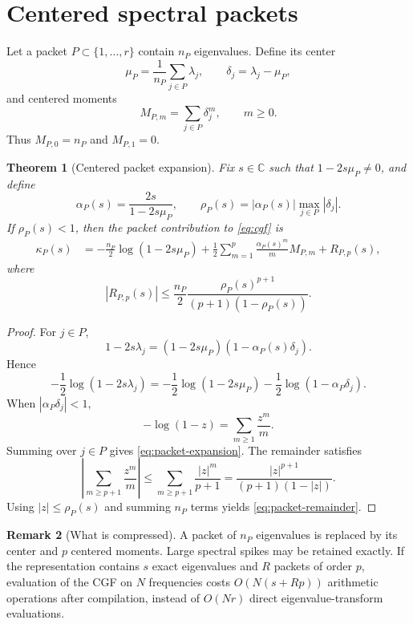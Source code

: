 \documentclass[11pt]{article}
\newtheorem{theorem}{Theorem}[section]
\theoremstyle{definition}
\newtheorem{remark}[theorem]{Remark}
\newcommand{\C}{\mathbb C}
\begin{document}
\section{Centered spectral packets}

Let a packet $P\subset\{1,\ldots,r\}$ contain $n_P$ eigenvalues. Define its center
\[
\mu_P=\frac{1}{n_P}\sum_{j\in P}\lambda_j,
\qquad
\delta_j=\lambda_j-\mu_P,
\]
and centered moments
\begin{equation}
M_{P,m}=\sum_{j\in P}\delta_j^m,
\qquad m\ge0.
\label{eq:centeredmoments}
\end{equation}
Thus $M_{P,0}=n_P$ and $M_{P,1}=0$.

\begin{theorem}[Centered packet expansion]
\label{thm:packet}
Fix $s\in\C$ such that $1-2s\mu_P\ne0$, and define
\begin{equation}
\alpha_P(s)=\frac{2s}{1-2s\mu_P},
\qquad
\rho_P(s)=|\alpha_P(s)|\max_{j\in P}|\delta_j|.
\label{eq:alpha-rho}
\end{equation}
If $\rho_P(s)<1$, then the packet contribution to \eqref{eq:cgf} is
\begin{align}
\kappa_P(s)
&=-\frac{n_P}{2}\log(1-2s\mu_P)
+\frac12\sum_{m=1}^{p}
\frac{\alpha_P(s)^m}{m}M_{P,m}
+R_{P,p}(s),
\label{eq:packet-expansion}
\end{align}
where
\begin{equation}
|R_{P,p}(s)|
\le
\frac{n_P}{2}
\frac{\rho_P(s)^{p+1}}{(p+1)(1-\rho_P(s))}.
\label{eq:packet-remainder}
\end{equation}
\end{theorem}

\begin{proof}
For $j\in P$,
\[
1-2s\lambda_j
=(1-2s\mu_P)(1-\alpha_P(s)\delta_j).
\]
Hence
\[
-\frac12\log(1-2s\lambda_j)
=-\frac12\log(1-2s\mu_P)
-\frac12\log(1-\alpha_P\delta_j).
\]
When $|\alpha_P\delta_j|<1$,
\[
-\log(1-z)=\sum_{m\ge1}\frac{z^m}{m}.
\]
Summing over $j\in P$ gives \eqref{eq:packet-expansion}. The remainder satisfies
\[
\left|\sum_{m\ge p+1}\frac{z^m}{m}\right|
\le
\sum_{m\ge p+1}\frac{|z|^m}{p+1}
=\frac{|z|^{p+1}}{(p+1)(1-|z|)}.
\]
Using $|z|\le\rho_P(s)$ and summing $n_P$ terms yields \eqref{eq:packet-remainder}.
\end{proof}

\begin{remark}[What is compressed]
A packet of $n_P$ eigenvalues is replaced by its center and $p$ centered moments. Large spectral spikes may be retained exactly. If the representation contains $s$ exact eigenvalues and $R$ packets of order $p$, evaluation of the CGF on $N$ frequencies costs $O(N(s+Rp))$ arithmetic operations after compilation, instead of $O(Nr)$ direct eigenvalue-transform evaluations.
\end{remark}
\end{document}
